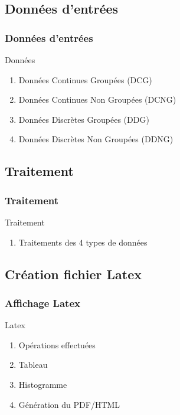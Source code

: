 \documentclass{beamer}
\begin{document}
\subsection{ Données d'entrées}
\begin{frame}[label=Données]
\frametitle{Données d'entrées}
\begin{beamerboxesrounded}[shadow=true]{Données}
		\begin{enumerate}
			\item Données Continues Groupées (DCG)\\
			\item Données Continues Non Groupées (DCNG)\\
			\item Données Discrètes Groupées (DDG)\\
			\item Données Discrètes Non Groupées (DDNG)
		\end{enumerate}
\end{beamerboxesrounded}
\end{frame}

\subsection{Traitement}
\begin{frame}[label=Traitement]
\frametitle{Traitement}
\begin{beamerboxesrounded}[shadow=true]{Traitement}
		\begin{enumerate}
			\item Traitements des 4 types de données
	
		\end{enumerate}
\end{beamerboxesrounded}
\end{frame}


\subsection{Création fichier Latex}
\begin{frame}[label=Création fichier Latex]
\frametitle{Affichage Latex}
\begin{beamerboxesrounded}[shadow=true]{Latex}
		\begin{enumerate}
			\item Opérations effectuées
			\item Tableau
			\item Histogramme
			\item Génération du PDF/HTML
		\end{enumerate}
\end{beamerboxesrounded}
\end{frame}
\end{document}
